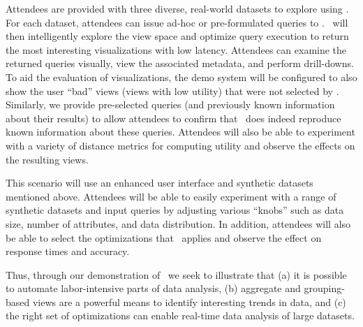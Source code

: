  Attendees are provided with three
diverse, real-world datasets to explore using \VizRecDB. For each dataset,
attendees can issue ad-hoc or pre-formulated queries to \VizRecDB. \VizRecDB\ will
then intelligently explore the view space and optimize query execution to return the
most interesting visualizations with low latency. Attendees can examine the
returned queries visually, view the associated metadata, and perform
drill-downs. To aid the evaluation of visualizations, the demo system will 
be configured to also show the user ``bad'' views (views with low utility) that were not selected
by \VizRecDB.
Similarly, we provide pre-selected queries (and
previously known information about their results) to allow attendees to
confirm that \VizRecDB\ does indeed reproduce known information about these
queries. Attendees will also be able to experiment with a
variety of distance metrics for computing utility and observe the effects on the
resulting views.


 This scenario
will use an enhanced user interface and synthetic datasets mentioned above.
Attendees will be able to easily experiment with a range of synthetic datasets and input
queries by adjusting various ``knobs'' such as data size, number of attributes, and
data distribution. In addition, attendees will also be able to select the
optimizations that \VizRecDB\ applies and observe the effect on response times and
accuracy.

Thus, through our demonstration of \VizRecDB\, we seek to illustrate that (a) it is
possible to automate labor-intensive parts of data analysis, (b) aggregate
and grouping-based views are a powerful means to identify interesting trends
in data, and (c) the right set of optimizations can enable real-time data
analysis of large datasets.

